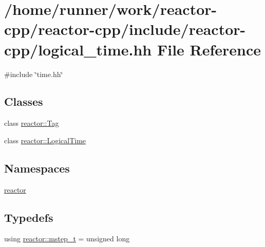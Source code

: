 \hypertarget{logical__time_8hh}{}\section{/home/runner/work/reactor-\/cpp/reactor-\/cpp/include/reactor-\/cpp/logical\+\_\+time.hh File Reference}
\label{logical__time_8hh}
{\ttfamily \#include \char`\"{}time.\+hh\char`\"{}}\newline
\subsection*{Classes}
\begin{DoxyCompactItemize}
\item 
class \hyperlink{classreactor_1_1Tag}{reactor\+::\+Tag}
\item 
class \hyperlink{classreactor_1_1LogicalTime}{reactor\+::\+Logical\+Time}
\end{DoxyCompactItemize}
\subsection*{Namespaces}
\begin{DoxyCompactItemize}
\item 
 \hyperlink{namespacereactor}{reactor}
\end{DoxyCompactItemize}
\subsection*{Typedefs}
\begin{DoxyCompactItemize}
\item 
using \hyperlink{namespacereactor_aaea1189d617982457b74127ba74a7340}{reactor\+::mstep\+\_\+t} = unsigned long
\end{DoxyCompactItemize}
